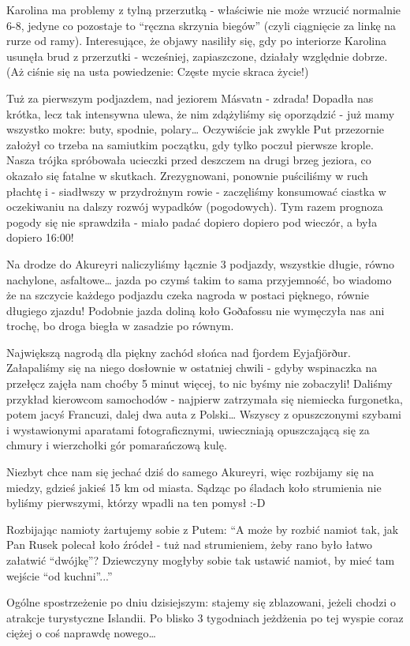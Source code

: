 Karolina ma problemy z tylną przerzutką - właściwie nie może wrzucić normalnie 6-8, jedyne co pozostaje to “ręczna skrzynia biegów” (czyli ciągnięcie za linkę na rurze od ramy). Interesujące, że objawy nasiliły się, gdy po interiorze Karolina usunęła brud z przerzutki - wcześniej, zapiaszczone, działały względnie dobrze. (Aż ciśnie się na usta powiedzenie: Częste mycie skraca życie!)

Tuż za pierwszym podjazdem, nad jeziorem Másvatn - zdrada! Dopadła nas krótka, lecz tak intensywna ulewa, że nim zdążyliśmy się oporządzić - już mamy wszystko mokre: buty, spodnie, polary… Oczywiście jak zwykle Put przezornie założył co trzeba na samiutkim początku, gdy tylko poczuł pierwsze krople. Nasza trójka spróbowała ucieczki przed deszczem na drugi brzeg jeziora, co okazało się  fatalne w skutkach. Zrezygnowani, ponownie puściliśmy w ruch płachtę i - siadłwszy w przydrożnym rowie - zaczęliśmy konsumować ciastka w oczekiwaniu na dalszy rozwój wypadków (pogodowych). Tym razem prognoza pogody się nie sprawdziła - miało padać dopiero dopiero pod wieczór, a była dopiero 16:00!

Na drodze do Akureyri naliczyliśmy łącznie 3 podjazdy, wszystkie długie, równo nachylone, asfaltowe… jazda po czymś takim to sama przyjemność, bo wiadomo że na szczycie każdego podjazdu czeka nagroda w postaci pięknego, równie długiego zjazdu! Podobnie jazda doliną koło Goðafossu nie wymęczyła nas ani trochę, bo droga biegła w zasadzie po równym.

Największą nagrodą dla piękny zachód słońca nad fjordem Eyjafjörður. Załapaliśmy się na niego dosłownie w ostatniej chwili - gdyby wspinaczka na przełęcz zajęła nam choćby 5 minut więcej, to nic byśmy nie zobaczyli! Daliśmy przykład kierowcom samochodów - najpierw zatrzymała się niemiecka furgonetka, potem jacyś Francuzi, dalej dwa auta z Polski… Wszyscy z opuszczonymi szybami i wystawionymi aparatami fotograficznymi, uwieczniają opuszczającą się za chmury i wierzchołki gór pomarańczową kulę.


Niezbyt chce nam się jechać dziś do samego Akureyri, więc rozbijamy się na miedzy, gdzieś jakieś 15 km od miasta. Sądząc po śladach koło strumienia nie byliśmy pierwszymi, którzy wpadli na ten pomysł :-D

Rozbijając namioty żartujemy sobie z Putem: “A może by rozbić namiot tak, jak Pan Rusek polecał koło źródeł - tuż nad strumieniem, żeby rano było łatwo załatwić “dwójkę”? Dziewczyny mogłyby sobie tak ustawić namiot, by mieć tam wejście “od kuchni”...”


Ogólne spostrzeżenie po dniu dzisiejszym: stajemy się zblazowani, jeżeli chodzi o atrakcje turystyczne Islandii. Po blisko 3 tygodniach jeżdżenia po tej wyspie coraz ciężej o coś naprawdę nowego…
